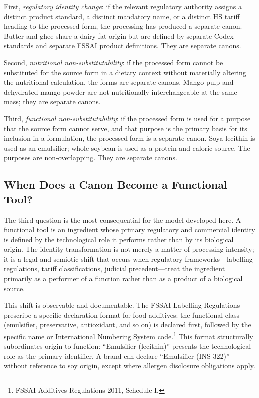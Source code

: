 \documentclass[12pt,a3paper]{article}
\begin{document}
First, \textit{regulatory identity change}: if the relevant regulatory authority assigns a distinct product standard, a distinct mandatory name, or a distinct HS tariff heading to the processed form, the processing has produced a separate canon. Butter and ghee share a dairy fat origin but are defined by separate Codex standards and separate FSSAI product definitions. They are separate canons.

Second, \textit{nutritional non-substitutability}: if the processed form cannot be substituted for the source form in a dietary context without materially altering the nutritional calculation, the forms are separate canons. Mango pulp and dehydrated mango powder are not nutritionally interchangeable at the same mass; they are separate canons.

Third, \textit{functional non-substitutability}: if the processed form is used for a purpose that the source form cannot serve, and that purpose is the primary basis for its inclusion in a formulation, the processed form is a separate canon. Soya lecithin is used as an emulsifier; whole soybean is used as a protein and caloric source. The purposes are non-overlapping. They are separate canons.

\subsection{When Does a Canon Become a Functional Tool?}

The third question is the most consequential for the model developed here. A functional tool is an ingredient whose primary regulatory and commercial identity is defined by the technological role it performs rather than by its biological origin. The identity transformation is not merely a matter of processing intensity; it is a legal and semiotic shift that occurs when regulatory frameworks---labelling regulations, tariff classifications, judicial precedent---treat the ingredient primarily as a performer of a function rather than as a product of a biological source.

This shift is observable and documentable. The FSSAI Labelling Regulations prescribe a specific declaration format for food additives: the functional class (emulsifier, preservative, antioxidant, and so on) is declared first, followed by the specific name or International Numbering System code.\footnote{FSSAI Additives Regulations 2011, Schedule I.} This format structurally subordinates origin to function: ``Emulsifier (lecithin)'' presents the technological role as the primary identifier. A brand can declare ``Emulsifier (INS 322)'' without reference to soy origin, except where allergen disclosure obligations apply.
\end{document}

